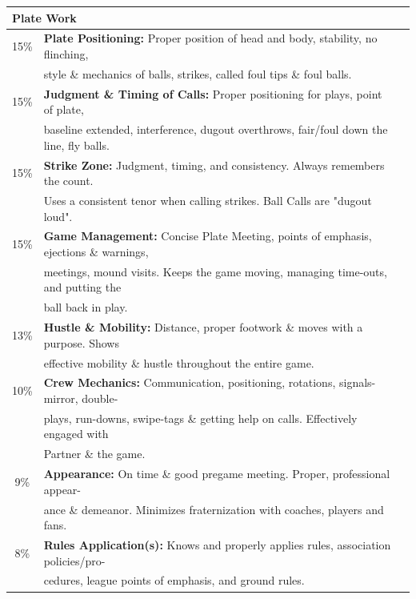 \documentclass[letterpaper,11pt,colorlinks=true,allcolors=blue]{article}
\begin{document}
\begin{tabular}{c l l}
\multicolumn{2}{l}{\textbf{Plate Work}} \\
\hline
15\% & \textbf{Plate Positioning:} Proper position of head and body, stability, no flinching, \\ 
& style \& mechanics of balls, strikes, called foul tips \& foul balls. \\
15\% & \textbf{Judgment \& Timing of Calls:} Proper positioning for plays, point of plate, \\
& baseline extended, interference, dugout overthrows, fair/foul down the line, fly balls. \\
15\% & \textbf{Strike Zone:} Judgment, timing, and consistency. Always remembers the count. \\
& Uses a consistent tenor when calling strikes. Ball Calls are "dugout loud". \\
15\% & \textbf{Game Management:} Concise Plate Meeting, points of emphasis, ejections \& warnings, \\
& meetings, mound visits. Keeps the game moving, managing time-outs, and putting the \\
& ball back in play. \\
13\% & \textbf{Hustle \& Mobility:} Distance, proper footwork \& moves with a purpose. Shows \\
& effective mobility \& hustle throughout the entire game. \\
10\% & \textbf{Crew Mechanics:} Communication, positioning, rotations, signals-mirror, double-\\
& plays, run-downs, swipe-tags \& getting help on calls. Effectively engaged with \\
& Partner \& the game. \\
 9\% & \textbf{Appearance:} On time \& good pregame meeting. Proper, professional appear- \\
& ance \& demeanor. Minimizes fraternization with coaches, players and fans. \\
 8\% & \textbf{Rules Application(s):} Knows and properly applies rules, association policies/pro- \\
& cedures, league points of emphasis, and ground rules. \\
\hline
\end{tabular}
\end{document}

